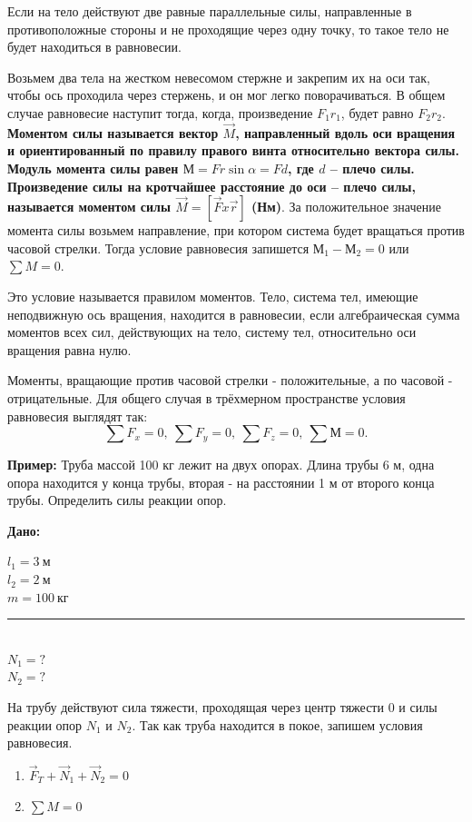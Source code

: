 \documentclass[a6paper, 11pt]{diss_4}
\renewcommand{\'}{\,'}
\begin{document}
 Если на тело действуют две равные параллельные силы, направленные в
противоположные стороны и не проходящие через одну точку, то такое тело не
будет находиться в равновесии.

Возьмем два тела на жестком невесомом стержне и закрепим их на оси так, чтобы ось
проходила через стержень, и он мог легко поворачиваться. В общем случае равновесие
наступит тогда, когда, произведение $F_1r_1$, будет равно $F_2r_2$. \textbf{ Моментом
силы  называется вектор $\vec{M}$, направленный вдоль оси вращения и ориентированный по
правилу правого винта относительно вектора силы. Модуль момента силы равен
$М=Fr\sin\alpha=Fd$, где $d$ -- плечо силы. Произведение силы на кротчайшее расстояние до
оси -- плечо силы, называется моментом силы $\vec{M}=\left[\vec{F}x\vec{r}\right]$ (Нм)}.
За положительное значение момента силы возьмем направление, при котором система будет
вращаться против часовой стрелки. Тогда условие равновесия запишется  $М_1-М_2=0$    или
$\sum M=0$.

 Это условие называется правилом моментов. Тело, система тел, имеющие
неподвижную ось вращения, находится в равновесии, если алгебраическая сумма
моментов всех сил, действующих на тело, систему тел, относительно оси вращения
равна нулю.

Моменты, вращающие против часовой стрелки - положительные, а по часовой - отрицательные.
Для общего случая в трёхмерном пространстве условия равновесия выглядят так:
\[
\sum F_x=0,\   \sum F_y=0,\  \sum F_z=0,\  \sum М=0.
\]


 \textbf{Пример:} Труба массой 100 кг лежит на двух опорах. Длина трубы 6 м, одна
опора находится у конца трубы, вторая - на расстоянии 1 м от второго конца
трубы. Определить силы реакции опор.

\hspace{1cm}\textbf{Дано:}\hspace{.3cm}
\parbox[t]{4cm}{
$l_1 =3\ м$\\
$l_2 =2\ м$\\
$m=100\ кг$\\
\rule{4cm}{.4pt}\\
$N_1 = ?$\\
$N_2 = ?$\\
}

На трубу действуют сила тяжести, проходящая через центр тяжести $0$ и силы реакции опор $N_1$ и $N_2$. Так как труба находится в покое, запишем условия равновесия.

\begin{enumerate}
  \item {$\vec{F}_T+\vec{N}_1+\vec{N}_2=0$}
  \item {$\sum M=0$}
\end{enumerate}
\end{document}
